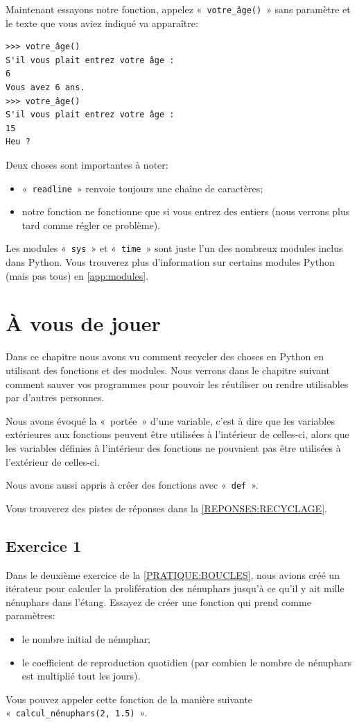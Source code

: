 Maintenant essayons notre fonction, appelez  « \texttt{votre\_âge()} » sans paramètre et le texte que vous aviez indiqué va apparaître:

\begin{Verbatim}[frame=single,rulecolor=\color{mbleu}, label=à taper]
>>> votre_âge()
S'il vous plait entrez votre âge :
6
Vous avez 6 ans.
>>> votre_âge()
S'il vous plait entrez votre âge :
15
Heu ?
\end{Verbatim}

Deux choses sont importantes à noter:
\begin{itemize}
\item « \texttt{readline} » renvoie toujours une chaîne de caractères;
\item notre fonction ne fonctionne que si vous entrez des entiers (nous verrons plus tard comme régler ce problème).
\end{itemize}

Les modules « \texttt{sys} »  et « \texttt{time} »  sont juste l'un des nombreux modules inclus dans Python. Vous trouverez plus d'information sur certains modules Python (mais pas tous) en \autoref{app:modules}.

\section{À vous de jouer\label{PRATIQUE:RECYCLAGE}}
Dans ce chapitre nous avons vu comment recycler des choses en Python en utilisant des fonctions et des modules.
Nous verrons dans le chapitre suivant comment sauver vos programmes pour pouvoir les réutiliser ou rendre utilisables par d'autres personnes.

Nous avons évoqué la « portée » d'une variable, c'est à dire que les variables extérieures aux fonctions peuvent être utilisées à l'intérieur de celles-ci, alors que les variables définies à l'intérieur des fonctions ne pouvaient pas être utilisées à l'extérieur de celles-ci.

Nous avons aussi appris à créer des fonctions avec « \texttt{def} ».

Vous trouverez des pistes de réponses dans la \autoref{REPONSES:RECYCLAGE}.


\subsection{Exercice 1}
Dans le deuxième exercice de la \autoref{PRATIQUE:BOUCLES}, nous avions créé un itérateur pour calculer la prolifération des nénuphars jusqu'à ce qu'il y ait mille nénuphars dans l'étang.
Essayez de créer une fonction qui prend comme paramètres:
\begin{itemize}
\item le nombre initial de nénuphar;
\item le coefficient de reproduction quotidien (par combien le nombre de nénuphars est multiplié tout les jours).
\end{itemize}
Vous pouvez appeler cette fonction de la manière suivante « \texttt{calcul\_nénuphars(2, 1.5)} ».

